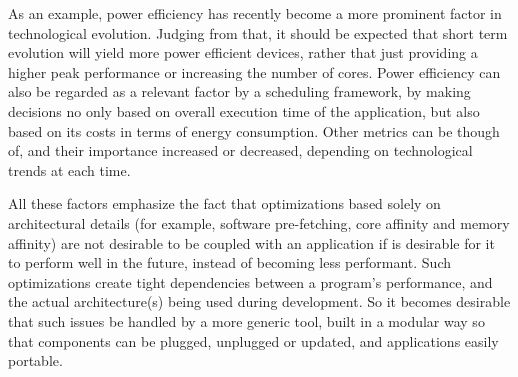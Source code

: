 \documentclass[main.tex]{subfiles}
\begin{document}
As an example, power efficiency has recently become a more prominent factor in technological evolution. Judging from that, it should be expected that short term evolution will yield more power efficient devices, rather that just providing a higher peak performance or increasing the number of cores. Power efficiency can also be regarded as a relevant factor by a scheduling framework, by making decisions no only based on overall execution time of the application, but also based on its costs in terms of energy consumption.
Other metrics can be though of, and their importance increased or decreased, depending on technological trends at each time.

All these factors emphasize the fact that optimizations based solely on architectural details (for example, software pre-fetching, core affinity and memory affinity) are not desirable to be coupled with an application if is desirable for it to perform well in the future, instead of becoming less performant. Such optimizations create tight dependencies between a program's performance, and the actual architecture(s) being used during development. So it becomes desirable that such issues be handled by a more generic tool, built in a modular way so that components can be plugged, unplugged or updated, and applications easily portable.
\end{document}
